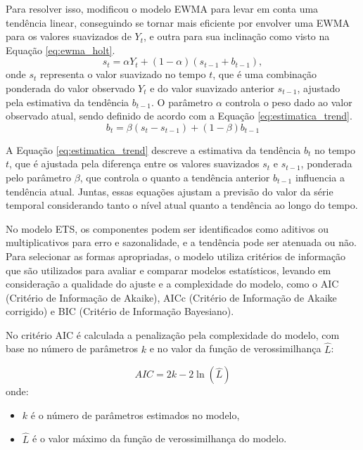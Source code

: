 Para resolver isso, \cite{holtETS} modificou o modelo EWMA para levar em conta uma tendência linear, conseguindo se tornar mais eficiente por envolver uma EWMA para 
os valores suavizados de $Y_t$, e outra para sua inclinação como visto na Equação \eqref{eq:ewma_holt}.
\begin{equation}
s_t = \alpha Y_t + (1 - \alpha) (s_{t-1} + b_{t-1}),
\label{eq:ewma_holt}
\end{equation}
onde \( s_t \) representa o valor suavizado no tempo \( t \), que é uma combinação ponderada do valor observado \( Y_t \) e do valor suavizado anterior \( s_{t-1} \), ajustado pela estimativa da tendência \( b_{t-1} \). O parâmetro \( \alpha \) controla o peso dado ao valor observado atual, sendo definido de acordo com a Equação \eqref{eq:estimatica_trend}.
\begin{equation}
b_t = \beta (s_t - s_{t-1}) + (1 - \beta) b_{t-1}
\label{eq:estimatica_trend}
\end{equation}

A Equação \eqref{eq:estimatica_trend} descreve a estimativa da tendência \( b_t \) no tempo \( t \), que é ajustada pela diferença entre os valores suavizados \( s_t \) e \( s_{t-1} \), ponderada pelo parâmetro \( \beta \), que controla o quanto a tendência anterior \( b_{t-1} \) influencia a tendência atual. Juntas, essas equações ajustam a previsão do valor da série temporal considerando tanto o nível atual quanto a tendência ao longo do tempo.

No modelo ETS, os componentes podem ser identificados como aditivos ou multiplicativos para erro e sazonalidade, e a tendência pode ser atenuada ou não. Para selecionar as formas apropriadas, o modelo utiliza critérios de informação que são utilizados para avaliar e comparar modelos estatísticos, levando em consideração a qualidade do ajuste e a complexidade do modelo, como o AIC (Critério de Informação de Akaike), AICc (Critério de Informação de Akaike corrigido) e BIC (Critério de Informação Bayesiano).

No critério AIC é calculada a penalização pela complexidade do modelo, com base no número de parâmetros \( k \) e no valor da função de verossimilhança \( \hat{L} \):

\begin{equation}
AIC = 2k - 2\ln(\hat{L})
\end{equation}
onde:
\begin{itemize}
    \item \( k \) é o número de parâmetros estimados no modelo,
    \item \( \hat{L} \) é o valor máximo da função de verossimilhança do modelo.
\end{itemize}


